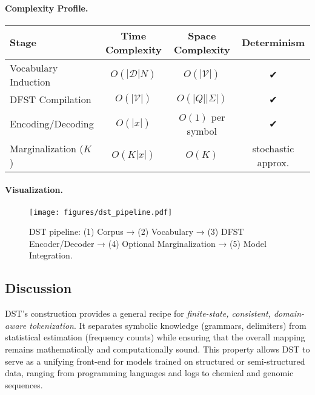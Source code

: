 \paragraph{Complexity Profile.}
\begin{center}
\begin{tabular}{lccc}
\toprule
Stage & Time Complexity & Space Complexity & Determinism \\
\midrule
Vocabulary Induction & $O(|\mathcal{D}|N)$ & $O(|\mathcal{V}|)$ & ✔ \\
DFST Compilation & $O(|\mathcal{V}|)$ & $O(|Q||\Sigma|)$ & ✔ \\
Encoding/Decoding & $O(|x|)$ & $O(1)$ per symbol & ✔ \\
Marginalization ($K$) & $O(K|x|)$ & $O(K)$ & stochastic approx. \\
\bottomrule
\end{tabular}
\end{center}

\paragraph{Visualization.}
\begin{figure}[h]
\centering
\texttt{[image: figures/dst\_pipeline.pdf]}
\caption{
DST pipeline:
(1) Corpus → (2) Vocabulary → (3) DFST Encoder/Decoder → (4) Optional Marginalization → (5) Model Integration.}
\label{fig:dst_pipeline}
\end{figure}

\subsection{Discussion}
DST’s construction provides a general recipe for
\emph{finite-state, consistent, domain-aware tokenization}.
It separates symbolic knowledge (grammars, delimiters)
from statistical estimation (frequency counts)
while ensuring that the overall mapping
remains mathematically and computationally sound.
This property allows DST to serve as
a unifying front-end for models trained on
structured or semi-structured data,
ranging from programming languages and logs
to chemical and genomic sequences.

